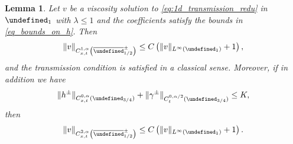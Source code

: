 \documentclass[12pt]{article}
\let\P\undefined
\numberwithin{Theorem}{section}
\newtheorem{Lemma}[Theorem]{Lemma}
\theoremstyle{definition}
\theoremstyle{remark}
\numberwithin{equation}{section}
\newcommand{\P}{\mathcal{P}}
\begin{document}
\begin{Lemma} \label{lm:reg1d}
    Let $v$ be a viscosity solution to \eqref{eq:1d_transmission_redu} in $\P_1$ with $\lambda \leq 1$ and the coefficients satisfy the bounds in \eqref{eq_bounds_on_h}.
    Then 
    \begin{equation} \label{eq:c1a_1d}
        \| v\|_{C_{x,t}^{1,{ \alpha}}\left( \overline{\P}_{1/2}^{\pm}\right)} \leq C \left( \| v\|_{L^{\infty}(\P_1)} +1 \right),
    \end{equation}
    and the transmission condition is satisfied in a classical sense.
    Moreover, if in addition we have 
    \[
    \| h^\pm \|_{C_{x,t}^{0,{ \alpha}}(\P_{3/4})} +  \| \gamma^\pm \|_{C_{t}^{0,{ \alpha/2}}(\P_{3/4})}   \leq K,   \]
    then
       \begin{equation} \label{eq:c2a_1d}
        \| v\|_{C_{x,t}^{2,{ \alpha}}\left( \overline{\P}_{1/2}^{\pm}\right)} \leq C \left( \| v\|_{L^{\infty}(\P_1)} +1 \right).
    \end{equation}

\end{Lemma}
\end{document}

